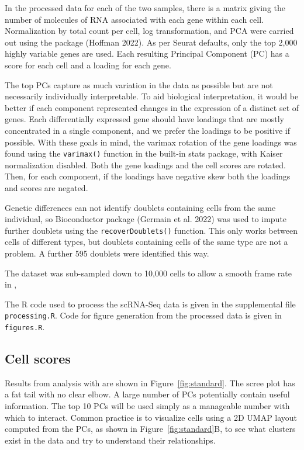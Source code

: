 In the processed data for each of the two samples, there is a matrix giving the number of molecules of RNA associated with each gene within each cell. Normalization by total count per cell, log transformation, and PCA were carried out using the  package (Hoffman 2022). As per Seurat defaults, only the top 2,000 highly variable genes are used. Each resulting Principal Component (PC) has a score for each cell and a loading for each gene.

The top PCs capture as much variation in the data as possible but are not necessarily individually interpretable. To aid biological interpretation, it would be better if each component represented changes in the expression of a distinct set of genes. Each differentially expressed gene should have loadings that are mostly concentrated in a single component, and we prefer the loadings to be positive if possible. With these goals in mind, the varimax rotation of the gene loadings was found using the \texttt{varimax()} function in the built-in stats package, with Kaiser normalization disabled. Both the gene loadings and the cell scores are rotated. Then, for each component, if the loadings have negative skew both the loadings and scores are negated.

Genetic differences can not identify doublets containing cells from the same individual, so Bioconductor package  (Germain et al. 2022) was used to impute further doublets using the \texttt{recoverDoublets()} function. This only works between cells of different types, but doublets containing cells of the same type are not a problem. A further 595 doublets were identified this way.

The dataset was sub-sampled down to 10,000 cells to allow a smooth frame rate in ,

The R code used to process the scRNA-Seq data is given in the supplemental file \texttt{processing.R}. Code for figure generation from the processed data is given in \texttt{figures.R}.

\hypertarget{cell-scores}{%
\subsection{Cell scores}\label{cell-scores}}

Results from analysis with  are shown in Figure~\ref{fig:standard}. The scree plot has a fat tail with no clear elbow. A large number of PCs potentially contain useful information. The top 10 PCs will be used simply as a manageable number with which to interact. Common practice is to visualize cells using a 2D UMAP layout computed from the PCs, as shown in Figure~\ref{fig:standard}B, to see what clusters exist in the data and try to understand their relationships.

